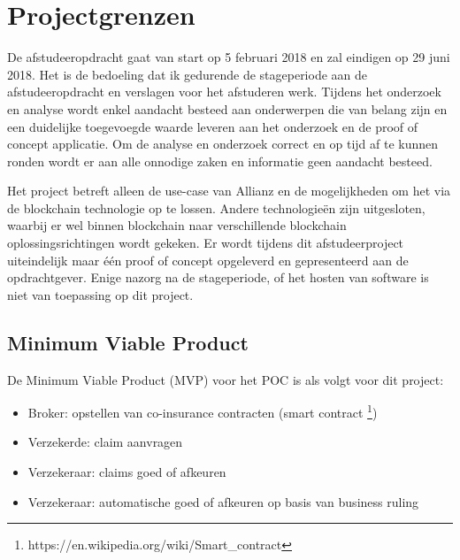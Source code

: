 \chapter{Projectgrenzen}
De afstudeeropdracht gaat van start op 5 februari 2018 en zal eindigen op 29 juni 2018. Het is de bedoeling dat ik gedurende de stageperiode aan de afstudeeropdracht en verslagen voor het afstuderen werk. Tijdens het onderzoek en analyse wordt enkel aandacht besteed aan onderwerpen die van belang zijn en een duidelijke toegevoegde waarde leveren aan het onderzoek en de proof of concept applicatie. Om de analyse en onderzoek correct en op tijd af te kunnen ronden wordt er aan alle onnodige zaken en informatie geen aandacht besteed.\par
Het project betreft alleen de use-case van Allianz en de mogelijkheden om het via de blockchain technologie op te lossen. Andere technologieën zijn uitgesloten, waarbij er wel binnen blockchain naar verschillende blockchain oplossingsrichtingen wordt gekeken. Er wordt tijdens dit afstudeerproject uiteindelijk maar één proof of concept opgeleverd en gepresenteerd aan de opdrachtgever. Enige nazorg na de stageperiode, of het hosten van software is niet van toepassing op dit project.

\section{Minimum Viable Product}
De Minimum Viable Product (MVP) voor het POC is als volgt voor dit project:
\begin{itemize}
  \item Broker: opstellen van co-insurance contracten (smart contract \footnote{https://en.wikipedia.org/wiki/Smart\_contract})
  \item Verzekerde: claim aanvragen
  \item Verzekeraar: claims goed of afkeuren
  \item Verzekeraar: automatische goed of
afkeuren op basis van business ruling
\end{itemize}